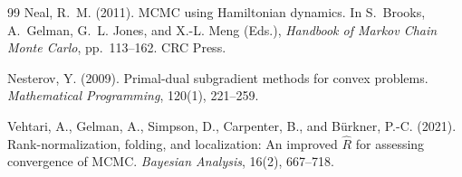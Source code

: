 \documentclass[12pt, a4paper]{article}
\theoremstyle{remark}
\begin{document}
\begin{thebibliography}{99}
Neal, R.~M. (2011).
MCMC using Hamiltonian dynamics.
In S.~Brooks, A.~Gelman, G.~L. Jones, and X.-L. Meng (Eds.),
\textit{Handbook of Markov Chain Monte Carlo}, pp.~113--162.
CRC Press.

Nesterov, Y. (2009).
Primal-dual subgradient methods for convex problems.
\textit{Mathematical Programming}, 120(1), 221--259.

Vehtari, A., Gelman, A., Simpson, D., Carpenter, B., and
B\"{u}rkner, P.-C. (2021).
Rank-normalization, folding, and localization: An improved $\hat{R}$
for assessing convergence of MCMC.
\textit{Bayesian Analysis}, 16(2), 667--718.

\end{thebibliography}
\end{document}
